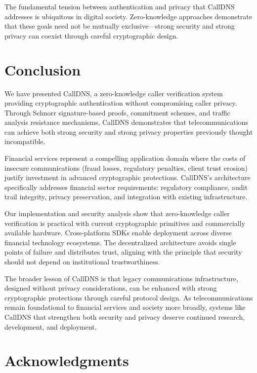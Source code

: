 \documentclass[11pt,twocolumn]{article}
\begin{document}
The fundamental tension between authentication and privacy that CallDNS addresses is ubiquitous in digital society. Zero-knowledge approaches demonstrate that these goals need not be mutually exclusive—strong security and strong privacy can coexist through careful cryptographic design.

\section{Conclusion}

We have presented CallDNS, a zero-knowledge caller verification system providing cryptographic authentication without compromising caller privacy. Through Schnorr signature-based proofs, commitment schemes, and traffic analysis resistance mechanisms, CallDNS demonstrates that telecommunications can achieve both strong security and strong privacy properties previously thought incompatible.

Financial services represent a compelling application domain where the costs of insecure communications (fraud losses, regulatory penalties, client trust erosion) justify investment in advanced cryptographic protections. CallDNS's architecture specifically addresses financial sector requirements: regulatory compliance, audit trail integrity, privacy preservation, and integration with existing infrastructure.

Our implementation and security analysis show that zero-knowledge caller verification is practical with current cryptographic primitives and commercially available hardware. Cross-platform SDKs enable deployment across diverse financial technology ecosystems. The decentralized architecture avoids single points of failure and distributes trust, aligning with the principle that security should not depend on institutional trustworthiness.

The broader lesson of CallDNS is that legacy communications infrastructure, designed without privacy considerations, can be enhanced with strong cryptographic protections through careful protocol design. As telecommunications remain foundational to financial services and society more broadly, systems like CallDNS that strengthen both security and privacy deserve continued research, development, and deployment.

\section*{Acknowledgments}
\end{document}
